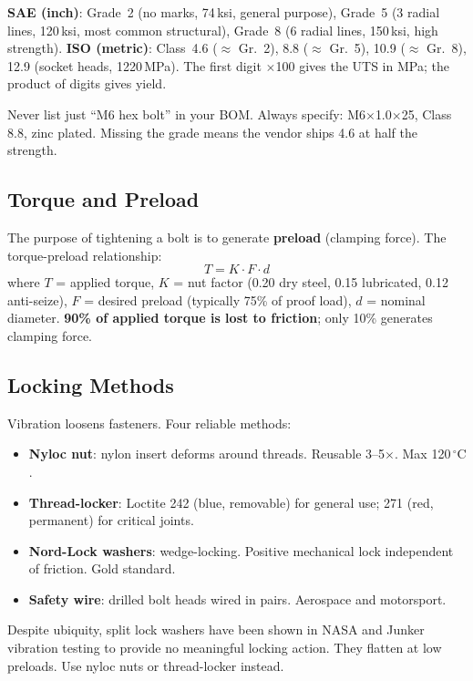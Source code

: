 \documentclass[11pt,letterpaper,twoside,openany]{book}
\newcommand{\degC}{\ensuremath{{}^{\circ}\text{C}}}
\begin{document}
\textbf{SAE (inch)}: Grade~2 (no marks, 74\,ksi, general purpose), Grade~5 (3 radial lines, 120\,ksi, most common structural), Grade~8 (6 radial lines, 150\,ksi, high strength). \textbf{ISO (metric)}: Class~4.6 ($\approx$ Gr.~2), 8.8 ($\approx$ Gr.~5), 10.9 ($\approx$ Gr.~8), 12.9 (socket heads, 1220\,MPa). The first digit $\times$100 gives the UTS in MPa; the product of digits gives yield.

\begin{tipbox}
Never list just ``M6 hex bolt'' in your BOM. Always specify: M6$\times$1.0$\times$25, Class 8.8, zinc plated. Missing the grade means the vendor ships 4.6 at half the strength.
\end{tipbox}

\subsection{Torque and Preload}
The purpose of tightening a bolt is to generate \textbf{preload} (clamping force). The torque-preload relationship:
\begin{equation}
T = K \cdot F \cdot d
\end{equation}
where $T$ = applied torque, $K$ = nut factor (0.20 dry steel, 0.15 lubricated, 0.12 anti-seize), $F$ = desired preload (typically 75\% of proof load), $d$ = nominal diameter. \textbf{90\% of applied torque is lost to friction}; only 10\% generates clamping force.

\subsection{Locking Methods}
Vibration loosens fasteners. Four reliable methods:
\begin{itemize}[nosep,leftmargin=1.5em]
\item \textbf{Nyloc nut}: nylon insert deforms around threads. Reusable 3--5$\times$. Max 120\,\degC{}.
\item \textbf{Thread-locker}: Loctite 242 (blue, removable) for general use; 271 (red, permanent) for critical joints.
\item \textbf{Nord-Lock washers}: wedge-locking. Positive mechanical lock independent of friction. Gold standard.
\item \textbf{Safety wire}: drilled bolt heads wired in pairs. Aerospace and motorsport.
\end{itemize}

\begin{tipbox}
Despite ubiquity, split lock washers have been shown in NASA and Junker vibration testing to provide no meaningful locking action. They flatten at low preloads. Use nyloc nuts or thread-locker instead.
\end{tipbox}
\end{document}
